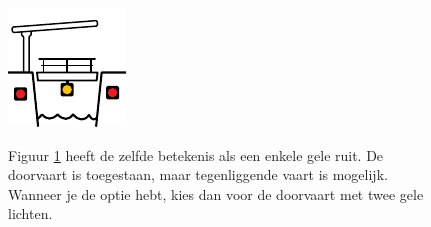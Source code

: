 \begin{figure}[H]
	\centering
	\begin{minipage}[b]{0.18\textwidth}
		\includegraphics[width=\textwidth]{Hoofdstukken/Bruggen/pdf/brug_doorvaart_toegestaan.pdf}
		\caption{}
		\label{pic:brug:toegestaan}
	\end{minipage}
	\hfill
	\begin{minipage}[t]{0.75\textwidth}
	\vspace{-2.5cm}
	Figuur \ref{pic:brug:toegestaan} heeft de zelfde betekenis als een enkele gele ruit. De doorvaart is toegestaan, maar tegenliggende vaart is mogelijk. Wanneer je de optie hebt, kies dan voor de doorvaart met twee gele lichten. 
\end{minipage}
\end{figure}
\vspace{-0.75cm}
